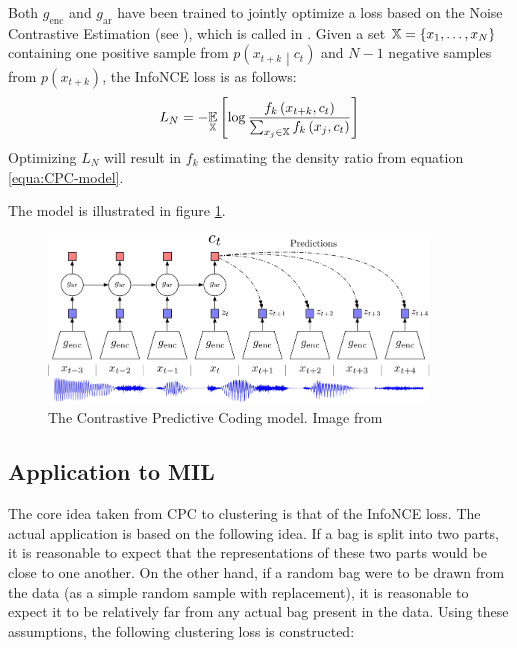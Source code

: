 Both \( g_\mathrm{enc} \) and \( g_\mathrm{ar} \) have been trained to jointly optimize a loss based on the Noise Contrastive Estimation (see \cite{gutmann_noise-contrastive_2010}), which is called  in \cite{oord_representation_2019}. Given a set \( \mathbb{X} = \left\{ x_1, \dots, x_N \right\} \) containing one positive sample from \( p \left( x_{t + k} \middle| c_t \right) \) and \( N - 1 \) negative samples from \( p \left( x_{t + k} \right) \), the InfoNCE loss is as follows:
\[ L_N = - \underset{\mathbb{X}}{\mathbb{E}} \left[ \log \frac{f_k \left( x_{t + k}, c_t \right)}{\sum_{x_j \in \mathbb{X}} f_k \left( x_j, c_t \right)} \right] \]
Optimizing \( L_N \) will result in \( f_k \) estimating the density ratio from equation \ref{equa:CPC-model}.

The model is illustrated in figure \ref{fig:CPC-paper-model}.

\begin{figure}[h]
	\centering
	\includegraphics[width=0.9\textwidth]{images/CPC-paper-model.pdf}
	\caption{The Contrastive Predictive Coding model. Image from \cite{oord_representation_2019}}\label{fig:CPC-paper-model}
\end{figure}

\subsection{Application to MIL}\label{subsec:CPC-application}

The core idea taken from CPC to clustering is that of the InfoNCE loss. The actual application is based on the following idea. If a bag is split into two parts, it is reasonable to expect that the representations of these two parts would be close to one another. On the other hand, if a random bag were to be drawn from the data (as a simple random sample with replacement), it is reasonable to expect it to be relatively far from any actual bag present in the data. Using these assumptions, the following clustering loss is constructed:

